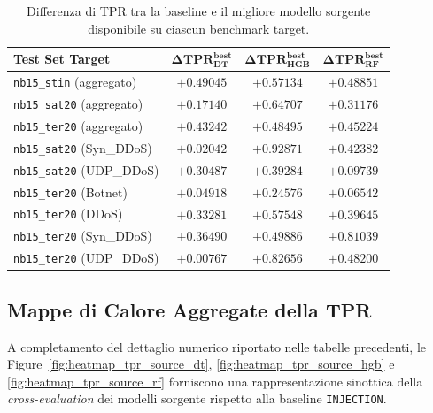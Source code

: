 \begin{table}[H]
    \centering
    \footnotesize
    \caption{Differenza di TPR tra la baseline e il migliore modello sorgente disponibile su ciascun benchmark target.}
    \label{tab:source_vs_base_best_source_delta}
    \begin{tabular}{lccc}
        \toprule
        \textbf{Test Set Target} & $\boldsymbol{\Delta TPR^{best}_{DT}}$ & $\boldsymbol{\Delta TPR^{best}_{HGB}}$ & $\boldsymbol{\Delta TPR^{best}_{RF}}$ \\
        \midrule
        \texttt{nb15\_stin} (aggregato) & $+0.49045$ & $+0.57134$ & $+0.48851$ \\
        \texttt{nb15\_sat20} (aggregato) & $+0.17140$ & $+0.64707$ & $+0.31176$ \\
        \texttt{nb15\_ter20} (aggregato) & $+0.43242$ & $+0.48495$ & $+0.45224$ \\
        \texttt{nb15\_sat20} (Syn\_DDoS) & $+0.02042$ & $+0.92871$ & $+0.42382$ \\
        \texttt{nb15\_sat20} (UDP\_DDoS) & $+0.30487$ & $+0.39284$ & $+0.09739$ \\
        \texttt{nb15\_ter20} (Botnet) & $+0.04918$ & $+0.24576$ & $+0.06542$ \\
        \texttt{nb15\_ter20} (DDoS) & $+0.33281$ & $+0.57548$ & $+0.39645$ \\
        \texttt{nb15\_ter20} (Syn\_DDoS) & $+0.36490$ & $+0.49886$ & $+0.81039$ \\
        \texttt{nb15\_ter20} (UDP\_DDoS) & $+0.00767$ & $+0.82656$ & $+0.48200$ \\
        \bottomrule
    \end{tabular}
\end{table}



\subsection{Mappe di Calore Aggregate della TPR}
\label{app:heatmap_tpr_sorgente}

A completamento del dettaglio numerico riportato nelle tabelle precedenti, le Figure~\ref{fig:heatmap_tpr_source_dt}, \ref{fig:heatmap_tpr_source_hgb} e \ref{fig:heatmap_tpr_source_rf} forniscono una rappresentazione sinottica della \textit{cross-evaluation} dei modelli sorgente rispetto alla baseline \texttt{INJECTION}.

